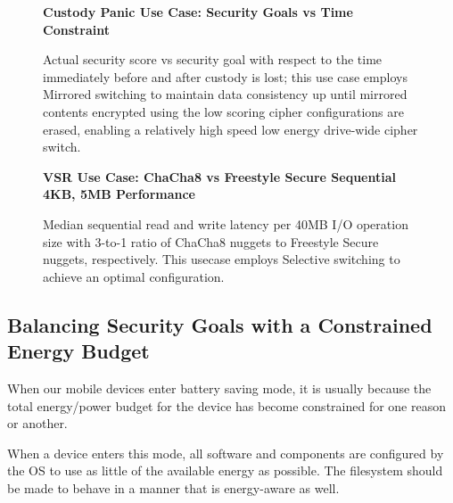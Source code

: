 \begin{figure}[ht] \textbf{Custody Panic Use Case: Security Goals vs Time
  Constraint}\par\medskip
     \centering
     {} \caption{Actual security score vs
     security goal with respect to the time immediately before and after custody
     is lost; this use case employs Mirrored switching to maintain data
     consistency up until mirrored contents encrypted using the low scoring cipher
     configurations are erased, enabling a relatively high speed low energy
     drive-wide cipher switch.}
    \label{fig:usecase-custody}
  \end{figure}

\begin{figure}[ht] \textbf{VSR Use Case: ChaCha8 vs Freestyle Secure Sequential
4KB, 5MB Performance}\par\medskip
   \centering
   {} \caption{Median sequential read and
   write latency per 40MB I/O operation size with 3-to-1 ratio of ChaCha8
   nuggets to Freestyle Secure nuggets, respectively. This usecase employs
   Selective switching to achieve an optimal configuration.}
  \label{fig:usecase-vsr-bar}
\end{figure}


\subsection{Balancing Security Goals with a Constrained Energy Budget}

When our mobile devices enter battery saving mode, it is usually because the
total energy/power budget for the device has become constrained for one reason
or another.

When a device enters this mode, all software and components are configured by
the OS to use as little of the available energy as possible. The filesystem
should be made to behave in a manner that is energy-aware as well.

